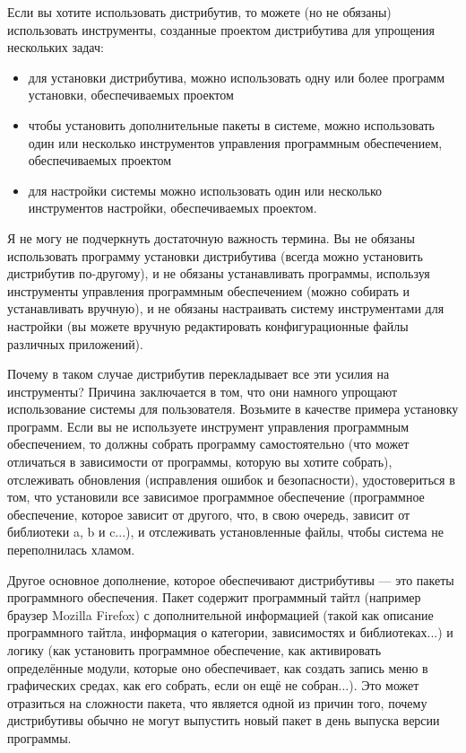 \documentclass[10pt]{book}
\begin{document}
Если вы хотите использовать дистрибутив, то можете (но не обязаны) использовать инструменты, созданные проектом дистрибутива для упрощения нескольких задач:

\begin{itemize}
	\item для установки дистрибутива, можно использовать одну или более программ установки, обеспечиваемых проектом
	\item чтобы установить дополнительные пакеты в системе, можно использовать один или несколько инструментов управления программным обеспечением, обеспечиваемых проектом
	\item для настройки системы можно использовать один или несколько инструментов настройки, обеспечиваемых проектом.
\end{itemize}

Я не могу не подчеркнуть достаточную важность термина. Вы не обязаны использовать программу установки дистрибутива (всегда можно установить дистрибутив по-другому), и не обязаны устанавливать программы, используя инструменты управления программным обеспечением (можно собирать и устанавливать вручную), и не обязаны настраивать систему инструментами  для настройки (вы можете вручную редактировать конфигурационные файлы различных приложений).

Почему в таком случае дистрибутив перекладывает все эти усилия на инструменты? Причина заключается в том, что они намного упрощают использование системы для пользователя.  Возьмите в качестве примера установку программ. Если вы не используете инструмент управления программным обеспечением, то должны собрать программу самостоятельно (что может отличаться в зависимости от программы, которую вы хотите собрать), отслеживать обновления (исправления ошибок и безопасности), удостовериться в том, что установили все зависимое программное обеспечение (программное обеспечение, которое зависит от другого, что, в свою очередь, зависит от библиотеки a, b и c...), и отслеживать установленные файлы, чтобы система не переполнилась хламом.

Другое основное дополнение, которое обеспечивают дистрибутивы — это пакеты программного обеспечения. Пакет содержит программный тайтл (например браузер Mozilla Firefox) с дополнительной информацией (такой как описание программного тайтла, информация о категории, зависимостях и библиотеках...) и логику (как установить программное обеспечение, как активировать определённые модули, которые оно обеспечивает, как создать запись меню в графических средах, как его собрать, если он ещё не собран...). Это может отразиться на сложности пакета, что является одной из причин того, почему дистрибутивы обычно не могут выпустить новый пакет в день выпуска версии программы.
\end{document}
